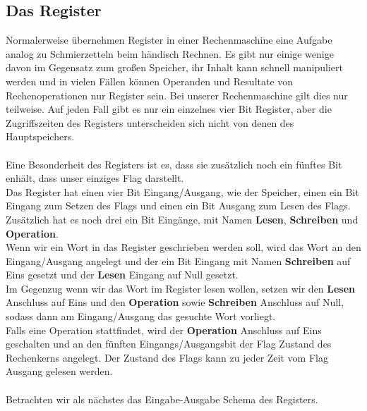 \documentclass[11pt,a4paper,leqno]{report}
\numberwithin{equation}{chapter}
\begin{document}
\subsection{Das Register}
Normalerweise \"ubernehmen Register in einer Rechenmaschine eine Aufgabe analog zu Schmierzetteln beim h\"andisch Rechnen. Es gibt nur einige wenige davon im Gegensatz zum gro\ss{}en Speicher, ihr Inhalt kann schnell manipuliert werden und in vielen F\"allen k\"onnen Operanden und Resultate von Rechenoperationen nur Register sein. Bei unserer Rechenmaschine gilt dies nur teilweise. Auf jeden Fall gibt es nur ein einzelnes vier Bit Register, aber die Zugriffszeiten des Registers unterscheiden sich nicht von denen des Hauptspeichers.\\
\\
Eine Besonderheit des Registers ist es, dass sie zus\"atzlich noch ein f\"unftes Bit enh\"alt, dass unser einziges Flag darstellt.\\
Das Register hat einen vier Bit Eingang/Ausgang, wie der Speicher, einen ein Bit Eingang zum Setzen des Flags und einen ein Bit Ausgang zum Lesen des Flags.
Zus\"atzlich hat es noch drei ein Bit Eing\"ange, mit Namen \textbf{Lesen}, \textbf{Schreiben} und \textbf{Operation}.\\
Wenn wir ein Wort in das Register geschrieben werden soll, wird das Wort an den Eingang/Ausgang angelegt und der ein Bit Eingang mit Namen \textbf{Schreiben} auf Eins gesetzt und der \textbf{Lesen} Eingang auf Null gesetzt.\\
Im Gegenzug wenn wir das Wort im Register lesen wollen, setzen wir den \textbf{Lesen} Anschluss auf Eins und den \textbf{Operation} sowie \textbf{Schreiben} Anschluss auf Null, sodass dann am Eingang/Ausgang das gesuchte Wort vorliegt.\\
Falls eine Operation stattfindet, wird der \textbf{Operation} Anschluss auf Eins geschalten und an den f\"unften Eingangs/Ausgangsbit der Flag Zustand des Rechenkerns angelegt.
Der Zustand des Flags kann zu jeder Zeit vom Flag Ausgang gelesen werden.\\
\\
Betrachten wir als n\"achstes das Eingabe-Ausgabe Schema des Registers.
\end{document}
